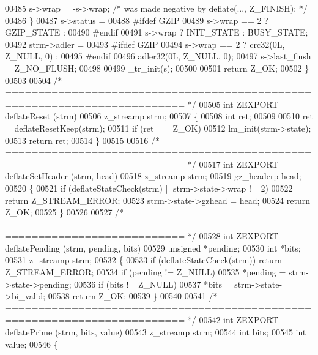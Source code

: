 \begin{DoxyCode}
00485         s->wrap = -s->wrap; \textcolor{comment}{/* was made negative by deflate(..., Z\_FINISH); */}
00486     \}
00487     s->status =
00488 \textcolor{preprocessor}{#ifdef GZIP}
00489         s->wrap == 2 ? GZIP\_STATE :
00490 \textcolor{preprocessor}{#endif}
00491         s->wrap ? INIT\_STATE : BUSY\_STATE;
00492     strm->adler =
00493 \textcolor{preprocessor}{#ifdef GZIP}
00494         s->wrap == 2 ? crc32(0L, Z\_NULL, 0) :
00495 #endif
00496         adler32(0L, Z\_NULL, 0);
00497     s->last\_flush = Z\_NO\_FLUSH;
00498 
00499     \_tr\_init(s);
00500 
00501     \textcolor{keywordflow}{return} Z\_OK;
00502 \}
00503 
00504 \textcolor{comment}{/* ========================================================================= */}
00505 \textcolor{keywordtype}{int} ZEXPORT deflateReset (strm)
00506     z\_streamp strm;
00507 \{
00508     \textcolor{keywordtype}{int} ret;
00509 
00510     ret = deflateResetKeep(strm);
00511     \textcolor{keywordflow}{if} (ret == Z\_OK)
00512         lm\_init(strm->state);
00513     \textcolor{keywordflow}{return} ret;
00514 \}
00515 
00516 \textcolor{comment}{/* ========================================================================= */}
00517 \textcolor{keywordtype}{int} ZEXPORT deflateSetHeader (strm, head)
00518     z\_streamp strm;
00519     gz\_headerp head;
00520 \{
00521     \textcolor{keywordflow}{if} (deflateStateCheck(strm) || strm->state->wrap != 2)
00522         \textcolor{keywordflow}{return} Z\_STREAM\_ERROR;
00523     strm->state->gzhead = head;
00524     \textcolor{keywordflow}{return} Z\_OK;
00525 \}
00526 
00527 \textcolor{comment}{/* ========================================================================= */}
00528 \textcolor{keywordtype}{int} ZEXPORT deflatePending (strm, pending, bits)
00529     \textcolor{keywordtype}{unsigned} *pending;
00530     \textcolor{keywordtype}{int} *bits;
00531     z\_streamp strm;
00532 \{
00533     \textcolor{keywordflow}{if} (deflateStateCheck(strm)) \textcolor{keywordflow}{return} Z\_STREAM\_ERROR;
00534     \textcolor{keywordflow}{if} (pending != Z\_NULL)
00535         *pending = strm->state->pending;
00536     \textcolor{keywordflow}{if} (bits != Z\_NULL)
00537         *bits = strm->state->bi\_valid;
00538     \textcolor{keywordflow}{return} Z\_OK;
00539 \}
00540 
00541 \textcolor{comment}{/* ========================================================================= */}
00542 \textcolor{keywordtype}{int} ZEXPORT deflatePrime (strm, bits, value)
00543     z\_streamp strm;
00544     \textcolor{keywordtype}{int} bits;
00545     \textcolor{keywordtype}{int} value;
00546 \{

\end{DoxyCode}
